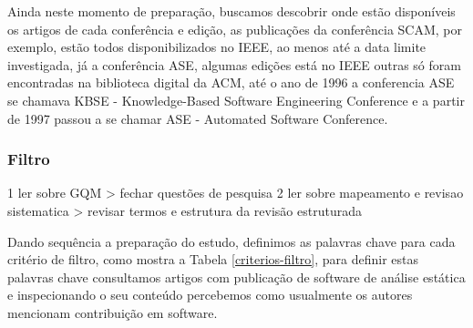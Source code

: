 Ainda neste momento de preparação, buscamos descobrir onde estão disponíveis os
artigos de cada conferência e edição, as publicações da conferência SCAM, por
exemplo, estão todos disponibilizados no IEEE, ao menos até a data limite
investigada, já a conferência ASE, algumas edições está no IEEE outras só foram
encontradas na biblioteca digital da ACM, até o ano de 1996 a conferencia ASE
se chamava KBSE - Knowledge-Based Software Engineering Conference e a partir de
1997 passou a se chamar ASE - Automated Software Conference.

\subsubsection{Filtro}

1 ler sobre GQM > fechar questões de pesquisa
2 ler sobre mapeamento e revisao sistematica > revisar termos e estrutura da revisão estruturada





Dando sequência a preparação do estudo, definimos as palavras chave para cada
critério de filtro, como mostra a Tabela \ref{criterios-filtro}, para definir
estas palavras chave consultamos artigos com publicação de software de análise
estática e inspecionando o seu conteúdo percebemos como usualmente os
autores mencionam contribuição em software.




